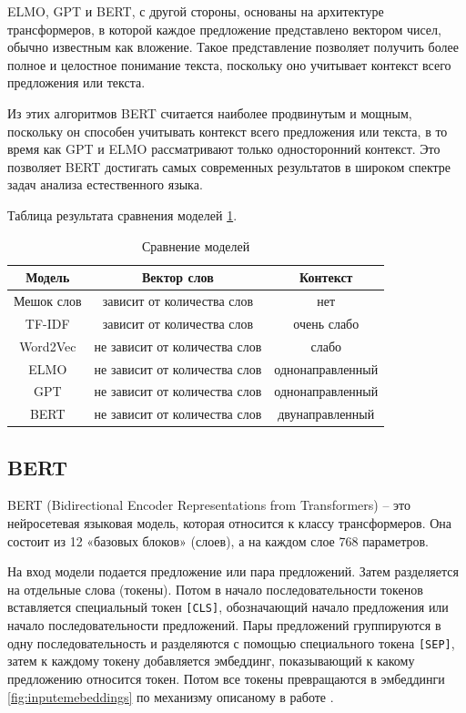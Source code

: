 \documentclass[PI, VKR]{HSEUniversity}
\begin{document}
ELMO, GPT и BERT, с другой стороны, основаны на архитектуре трансформеров, в которой каждое предложение представлено вектором чисел, обычно известным как вложение. Такое представление позволяет получить более полное и целостное понимание текста, поскольку оно учитывает контекст всего предложения или текста.

Из этих алгоритмов BERT считается наиболее продвинутым и мощным, поскольку он способен учитывать контекст всего предложения или текста, в то время как GPT и ELMO рассматривают только односторонний контекст. Это позволяет BERT достигать самых современных результатов в широком спектре задач анализа естественного языка.

Таблица результата сравнения моделей \ref{tbl:model_compare}.

\begin{table}[h!]
\caption{\label{tbl:model_compare}Сравнение моделей}
\centering
\begin{tabular}{|c|c|c|}
\hline
Модель & Вектор слов & Контекст\\[0pt]
\hline
Мешок слов & зависит от количества слов & нет\\[0pt]
\hline
TF-IDF & зависит от количества слов & очень слабо\\[0pt]
\hline
Word2Vec & не зависит от количества слов & слабо\\[0pt]
\hline
ELMO & не зависит от количества слов & однонаправленный\\[0pt]
\hline
GPT & не зависит от количества слов & однонаправленный\\[0pt]
\hline
BERT & не зависит от количества слов & двунаправленный\\[0pt]
\hline
\end{tabular}
\end{table}

\subsection{BERT}
\label{sec:orgd0e2ec5}
BERT \autocite{devlin_bert_2019} (Bidirectional Encoder Representations from Transformers) -- это нейросетевая языковая модель, которая относится к классу трансформеров. Она состоит из 12 «базовых блоков» (слоев), а на каждом слое 768 параметров.

На вход модели подается предложение или пара предложений. Затем разделяется на отдельные слова (токены). Потом в начало последовательности токенов вставляется специальный токен \texttt{[CLS]}, обозначающий начало предложения или начало последовательности предложений. Пары предложений группируются в одну последовательность и разделяются с помощью специального токена \texttt{[SEP]}, затем к каждому токену добавляется эмбеддинг, показывающий к какому предложению относится токен. Потом все токены превращаются в эмбеддинги \ref{fig:inputemebeddings} по механизму описаному в работе \autocite{vaswani_attention_2017}.
\end{document}
